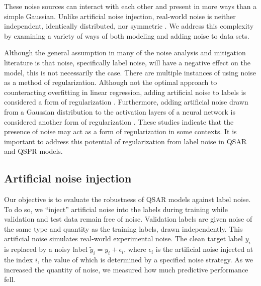 These noise sources can interact with each other and present in more ways than a simple Gaussian. Unlike artificial noise injection, real-world noise is neither independent, identically distributed, nor symmetric  \citep{Heid2023}. We address this complexity by examining a variety of ways of both modeling and adding noise to data sets. 

Although the general assumption in many of the noise analysis and mitigation literature is that noise, specifically label noise, will have a negative effect on the model, this is not necessarily the case. There are multiple instances of using noise as a method of regularization. Although not the optimal approach to counteracting overfitting in linear regression, adding artificial noise to labels is considered a form of regularization \citep{Ullah2024}. Furthermore, adding artificial noise drawn from a Gaussian distribution to the activation layers of a neural network is considered another form of regularization \citep{Camuto2021}. These studies indicate that the presence of noise may act as a form of regularization in some contexts. It is important to address this potential of regularization from label noise in QSAR and QSPR models.

\subsection{Artificial noise injection}\label{sec:noise_injection}

Our objective is to evaluate the robustness of QSAR models against label noise. To do so, we ``inject'' artificial noise into the labels during training while validation and test data remain free of noise. Validation labels are given noise of the same type and quantity as the training labels, drawn independently. This artificial noise simulates real-world experimental noise. The clean target label $y_i$ is replaced by a noisy label $\tilde{y}_i = y_i + \epsilon_i$, where $\epsilon_i$ is the artificial noise injected at the index $i$, the value of which is determined by a specified noise strategy. As we increased the quantity of noise, we measured how much predictive performance fell. 

